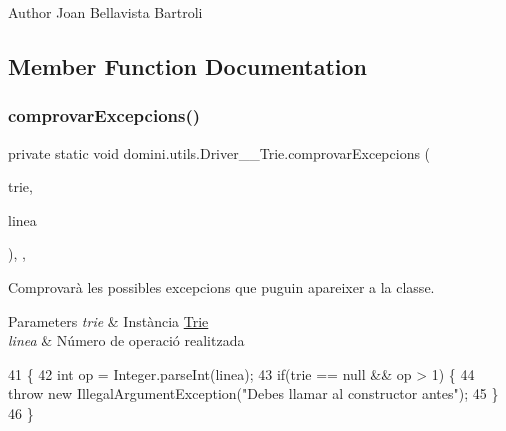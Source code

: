 \begin{DoxyAuthor}{Author}
Joan Bellavista Bartroli 
\end{DoxyAuthor}


\subsection{Member Function Documentation}
\mbox{\label{classdomini_1_1utils_1_1Driver____Trie_a6fd273250b3951144ce3a76f26330ab1}} 
\subsubsection{\texorpdfstring{comprovar\+Excepcions()}{comprovarExcepcions()}}
{\footnotesize\ttfamily private static void domini.\+utils.\+Driver\+\_\+\+\_\+\+Trie.\+comprovar\+Excepcions (\begin{DoxyParamCaption}\item[{\hyperlink{classdomini_1_1utils_1_1Trie}{Trie}$<$ Byte $>$}]{trie,  }\item[{String}]{linea }\end{DoxyParamCaption})\hspace{0.3cm}{\ttfamily [inline]}, {\ttfamily [static]}, {\ttfamily [private]}}



Comprovarà les possibles excepcions que puguin apareixer a la classe. 


\begin{DoxyParams}{Parameters}
{\em trie} & Instància \hyperlink{classdomini_1_1utils_1_1Trie}{Trie} \\
\hline
{\em linea} & Número de operació realitzada \\
\hline
\end{DoxyParams}

\begin{DoxyCode}
41                                                                           \{
42         \textcolor{keywordtype}{int} op = Integer.parseInt(linea);
43         \textcolor{keywordflow}{if}(trie == null && op > 1) \{
44             \textcolor{keywordflow}{throw} \textcolor{keyword}{new} IllegalArgumentException(\textcolor{stringliteral}{"Debes llamar al constructor antes"});
45         \}
46     \}
\end{DoxyCode}
\mbox{\label{classdomini_1_1utils_1_1Driver____Trie_a00769a23a8d74a6f4bc05c19a2bd8519}} 
